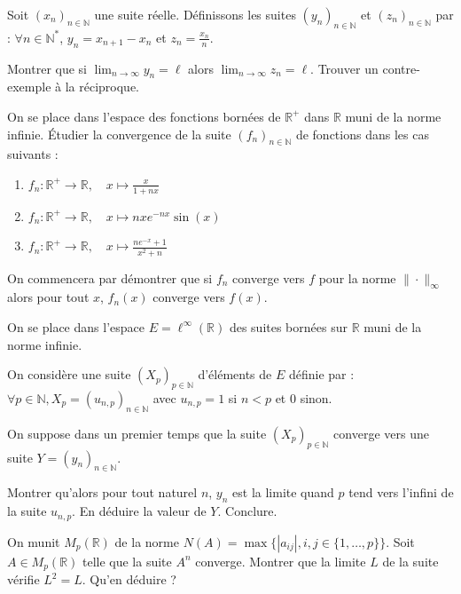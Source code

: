 \begin{exercice}
Soit $(x_{n})_{n\in\mathbb{N}}$ une suite réelle. Définissons les suites $(y_{n})_{n\in\mathbb{N}}$ et $(z_{n})_{n\in\mathbb{N}}$ par :
$\forall n\in\mathbb{N}^{*}$, $y_{n}=x_{n+1}-x_{n}$ et $z_{n}=\frac{x_{n}}{n}$.

Montrer que si $\lim_{n\rightarrow\infty}y_{n}=\ell$ alors $\lim_{n\rightarrow\infty}z_{n}=\ell$.
Trouver un contre-exemple à la réciproque.
\end{exercice}

\begin{exercice}
On se place dans l'espace des fonctions bornées de $\mathbb{R}^{+}$ dans $\mathbb{R}$ muni de la norme infinie.
Étudier la convergence de la suite $(f_{n})_{n\in\mathbb{N}}$ de fonctions dans les cas suivants :
\begin{enumerate}
    \item $f_{n}:\mathbb{R}^{+}\rightarrow\mathbb{R}, \quad x\mapsto\frac{x}{1+nx}$
    \item $f_{n}:\mathbb{R}^{+}\rightarrow\mathbb{R}, \quad x\mapsto nxe^{-nx}\sin(x)$
    \item $f_{n}:\mathbb{R}^{+}\rightarrow\mathbb{R}, \quad x\mapsto\frac{ne^{-x}+1}{x^{2}+n}$
\end{enumerate}
On commencera par démontrer que si $f_{n}$ converge vers $f$ pour la norme $\|\cdot\|_{\infty}$ alors pour tout $x$, $f_{n}(x)$ converge vers $f(x)$.
\end{exercice}

\begin{exercice}
On se place dans l'espace $E=\ell^{\infty}(\mathbb{R})$ des suites bornées sur $\mathbb{R}$ muni de la norme infinie.

On considère une suite $(X_{p})_{p\in\mathbb{N}}$ d'éléments de $E$ définie par : $\forall p\in\mathbb{N}, X_{p}=(u_{n,p})_{n\in\mathbb{N}}$ avec $u_{n,p}=1$ si $n<p$ et $0$ sinon.

On suppose dans un premier temps que la suite $(X_{p})_{p\in\mathbb{N}}$ converge vers une suite $Y=(y_{n})_{n\in\mathbb{N}}$.

Montrer qu'alors pour tout naturel $n$, $y_{n}$ est la limite quand $p$ tend vers l'infini de la suite $u_{n,p}$.
En déduire la valeur de $Y$. Conclure.
\end{exercice}

\begin{exercice}
On munit $M_{p}(\mathbb{R})$ de la norme $N(A) = \max\{|a_{ij}|, i,j\in\{1,\dots,p\}\}$.
Soit $A\in M_{p}(\mathbb{R})$ telle que la suite $A^{n}$ converge.
Montrer que la limite $L$ de la suite vérifie $L^{2}=L$. Qu'en déduire ?
\end{exercice}

